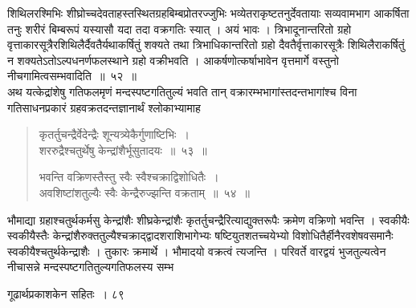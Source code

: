 \documentclass[11pt, openany]{book}
\begin{document}
\begin{sloppypar}
\noindent शिथिलरश्मिभिः शीघ्रोच्चदेवताहस्तस्थितग्रहबिम्बप्रोतरज्जुभिः भव्येतराकृष्टतनुर्देवतायाः सव्यवामभाग आकर्षिता तनुः शरीरं बिम्बरूपं यस्यासौ यदा तदा वक्रगतिः स्यात् । अयं भावः । त्रिभादूनान्तरितो ग्रहो वृत्ताकारसूत्रैरशिथिलैर्दैवतैर्यथाकर्षितुं शक्यते तथा त्रिभाधिकान्तरितो ग्रहो दैवतैर्वृत्ताकारसूत्रैः शिथिलैराकर्षितुं न शक्यतेऽतोऽल्पधनर्णफलस्थाने ग्रहो वक्रीभवति । आकर्षणोत्कर्षाभावेन वृत्तमार्गे वस्तुनो नीचगामित्वसम्भवादिति~॥~५२~॥\\
\noindent अथ यत्केद्रांशेषु गतिफलमृणं मन्दस्पष्टगतितुल्यं भवति तान् वक्रारम्भभागांस्तदन्तभागांश्च विना गतिसाधनप्रकारं ग्रहवक्रतदन्तज्ञानार्थं श्लोकाभ्यामाह\textendash
\end{sloppypar}
\begin{quote}

{\ssi कृतर्तुचन्द्रैर्वेदेन्द्रैः शून्यत्र्येकैर्गुणाष्टिभिः~।\\
शररुद्रैश्चतुर्थेषु केन्द्रांशैर्भूसुतादयः~॥~५३~॥

भवन्ति वक्रिणस्तैस्तु स्वैः स्वैश्चक्राद्विशोधितैः~।\\
अवशिष्टांशतुल्यैः स्वैः केन्द्रैरुज्झन्ति वक्रताम्~॥~५४~॥}
\end{quote}
\begin{sloppypar}
भौमाद्या ग्रहाश्चतुर्थकर्मसु केन्द्रांशैः शीघ्रकेन्द्रांशैः कृतर्तुचन्द्रैरित्याद्युक्तरूपैः क्रमेण वक्रिणो भवन्ति । स्वकीयैः स्वकीयैस्तैः केन्द्रांशैरुक्ततुल्यैश्चक्राद्द्वादशराशिभागेभ्यः षष्टियुतशतच्चयेभ्यो विशोधितैर्हीनैरवशेषवसमानैः स्वकीयैश्चतुर्थकेन्द्राशैः । तुकारः क्रमार्थे । भौमादयो वक्रत्वं त्यजन्ति । परिवर्ते वारद्वयं भुजतुल्यत्वेन नीचासन्ने मन्दस्पष्टगतितुल्यगतिफलस्य सम्भ\textendash
\end{sloppypar}



\newpage


\hspace{3cm}गूढार्थप्रकाशकेन सहितः~। \hfill ८९
\vspace{1cm}
\end{document}
